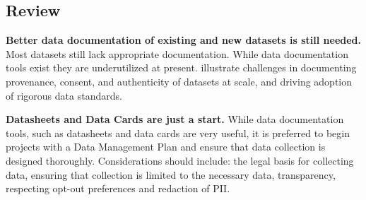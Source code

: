 
\subsection{Review}

\textbf{Better data documentation of existing and new datasets is still needed.} Most datasets still lack appropriate documentation. While data documentation tools exist they are underutilized at present.
\citet{longpre2024data} illustrate challenges in documenting provenance, consent, and authenticity of datasets at scale, and driving adoption of rigorous data standards.

\textbf{Datasheets and Data Cards are just a start.} While data documentation tools, such as datasheets and data cards are very useful, it is preferred to begin projects with a Data Management Plan and ensure that data collection is designed thoroughly. Considerations should include: the legal basis for collecting data, ensuring that collection is limited to the necessary data, transparency, respecting opt-out preferences and redaction of PII. 






